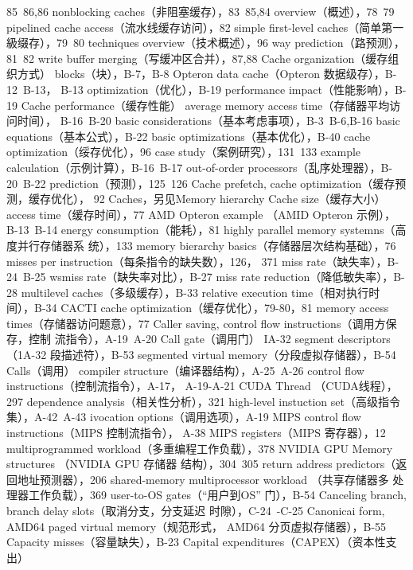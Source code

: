85~86,86
nonblocking caches（非阻塞缓存），83~85,84
overview（概述），78~79
pipelined cache access（流水线缓存访问），82
simple first-level caches（简单第一級缀存），79~80
techniques overview（技术概述），96
way prediction（路预测），81~82
write buffer merging（写缓冲区合并），87,88
Cache organization（缓存组织方式）
blocks（块），B-7，B-8
Opteron data cache（Opteron 数据级存），B-12~B-13，
B-13
optimization（优化），B-19
performance impact（性能影响），B-19
Cache performance（缓存性能）
average memory access time（存储器平均访问时间），
B-16~B-20
basic considerations（基本考虑事项），B-3~B-6,B-16
basic equations（基本公式），B-22
basic optimizations（基本优化），B-40
cache optimization（绥存优化），96
case study（案例研究），131~133
example calculation（示例计算），B-16~B-17
out-of-order processors（乱序处理器），B-20~B-22
prediction（预测），125~126
Cache prefetch, cache optimization（缓存预测，缓存优化），
92
Caches，另见Memory hierarchy
Cache size（缓存大小）
access time（缓存时间），77
AMD Opteron example （AMID Opteron 示例），
B-13~B-14
energy consumption（能耗），81
highly parallel memory systemns（高度并行存储器系
统），133
memory bierarchy basics（存储器层次结构基础），76
misses per instruction（每条指令的缺失数），126，
371
miss rate（缺失率），B-24~B-25
wsmiss rate（缺失率对比），B-27
miss rate reduction（降低敏失率），B-28
multilevel caches（多级缓存），B-33
relative execution time（相对执行时间），B-34
CACTI
cache optimization（缓存优化），79-80，81
memory access times（存储器访问题意），77
Caller saving, control flow instructions（调用方保存，控制
流指令），A-19~A-20
Call gate（调用门）
IA-32 segment descriptors（1A-32 段描述符），B-53
segmented virtual memory（分段虚拟存储器），B-54
Calls（调用）
compiler structure（编译器结构），A-25~A-26
control flow instructions（控制流指令），A-17，
A-19-A-21
CUDA Thread （CUDA线程），297
dependence analysis（相关性分析），321
high-level instuction set（高级指令集），A-42~A-43
ivocation options（调用选项），A-19
MIPS control flow instructions（MIPS 控制流指令），
A-38
MIPS registers（MIPS 寄存器），12
multiprogrammed workload（多重编程工作负载），378
NVIDIA GPU Memory structures （NVIDIA GPU 存储器
结构），304~305
return address predictors（返回地址预测器），206
shared-memory multiprocessor workload （共享存储器多
处理器工作负载），369
user-to-OS gates（“用户到OS” 门），B-54
Canceling branch, branch delay slots（取消分支，分支延迟
时隙），C-24~-C-25
Canonicai form, AMD64 paged virtual memory（规范形式，
AMD64 分页虚拟存储器），B-55
Capacity misses（容量缺失），B-23
Capital expenditures（CAPEX）（资本性支出）
